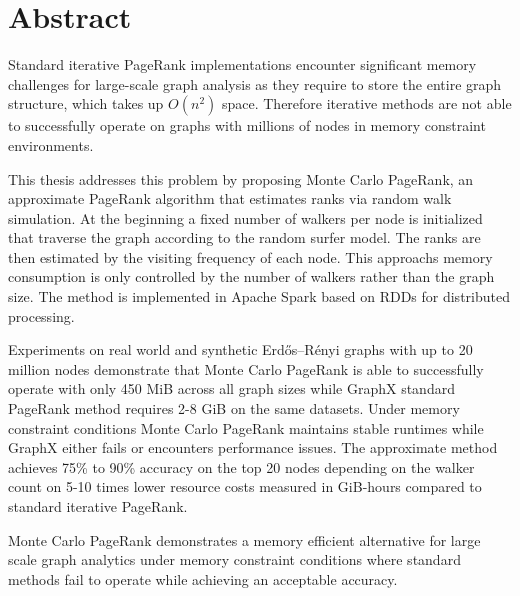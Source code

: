 \section*{Abstract}

Standard iterative PageRank implementations encounter significant memory challenges for large-scale graph analysis as they require to store the entire graph structure, which takes up $O(n^2)$ space. Therefore iterative methods are not able to successfully operate on graphs with millions of nodes in memory constraint environments.\par

This thesis addresses this problem by proposing Monte Carlo PageRank, an approximate PageRank algorithm that estimates ranks via random walk simulation. At the beginning a fixed number of walkers per node is initialized that traverse the graph according to the random surfer model. The ranks are then estimated by the visiting frequency of each node. This approachs memory consumption is only controlled by the number of walkers rather than the graph size. The method is implemented in Apache Spark based on RDDs for distributed processing.\par

Experiments on real world and synthetic Erdős–Rényi graphs with up to 20 million nodes demonstrate that Monte Carlo PageRank is able to successfully operate with only 450 MiB across all graph sizes while GraphX standard PageRank method requires 2-8 GiB on the same datasets. Under memory constraint conditions Monte Carlo PageRank maintains stable runtimes while GraphX either fails or encounters performance issues. The approximate method achieves 75\% to 90\% accuracy on the top 20 nodes depending on the walker count on 5-10 times lower resource costs measured in GiB-hours compared to standard iterative PageRank. \par

Monte Carlo PageRank demonstrates a memory efficient alternative for large scale graph analytics under memory constraint conditions where standard methods fail to operate while achieving an acceptable accuracy.






